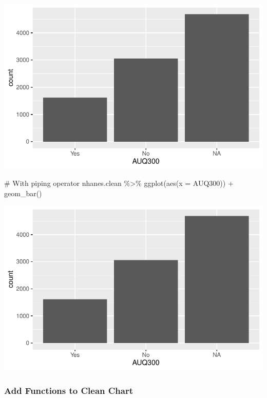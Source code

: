 \documentclass[
  letterpaper,
  DIV=11,
  numbers=noendperiod]{scrreprt}
\newenvironment{Shaded}{\begin{snugshade}}{\end{snugshade}}
\newcommand{\AttributeTok}[1]{\textcolor[rgb]{0.40,0.45,0.13}{#1}}
\newcommand{\CommentTok}[1]{\textcolor[rgb]{0.37,0.37,0.37}{#1}}
\newcommand{\FunctionTok}[1]{\textcolor[rgb]{0.28,0.35,0.67}{#1}}
\newcommand{\NormalTok}[1]{\textcolor[rgb]{0.00,0.23,0.31}{#1}}
\newcommand{\SpecialCharTok}[1]{\textcolor[rgb]{0.37,0.37,0.37}{#1}}
\begin{document}
\includegraphics{dataviz_files/figure-pdf/unnamed-chunk-11-1.pdf}

\begin{Shaded}
\begin{Highlighting}[]
\CommentTok{\# With piping operator}
\NormalTok{nhanes.clean }\SpecialCharTok{\%\textgreater{}\%}
    \FunctionTok{ggplot}\NormalTok{(}\FunctionTok{aes}\NormalTok{(}\AttributeTok{x =}\NormalTok{ AUQ300)) }\SpecialCharTok{+} \FunctionTok{geom\_bar}\NormalTok{()}
\end{Highlighting}
\end{Shaded}

\includegraphics{dataviz_files/figure-pdf/unnamed-chunk-11-2.pdf}

\subsubsection{Add Functions to Clean
Chart}\label{add-functions-to-clean-chart}
\end{document}
